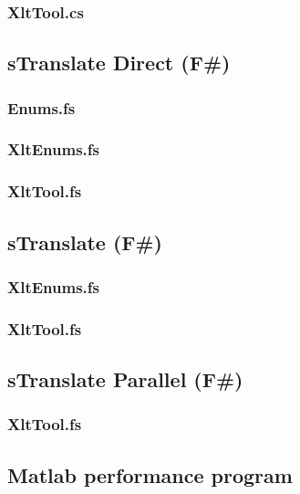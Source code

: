 \documentclass[12pt, a4paper]{article}
\begin{document}
\subsubsection{XltTool.cs}


\newpage
\subsection{sTranslate Direct (F\#)}
\label{AppendixFSharpDirect}
\subsubsection{Enums.fs}

\newpage
\subsubsection{XltEnums.fs}

\newpage
\subsubsection{XltTool.fs}


\newpage
\subsection{sTranslate (F\#)}
\label{AppendixFSharp}
\subsubsection{XltEnums.fs}

\newpage
\subsubsection{XltTool.fs}


\newpage
\subsection{sTranslate Parallel (F\#)}
\label{AppendixFSharpParallel}
\subsubsection{XltTool.fs}


\newpage
\subsection{Matlab performance program}

\end{document}
